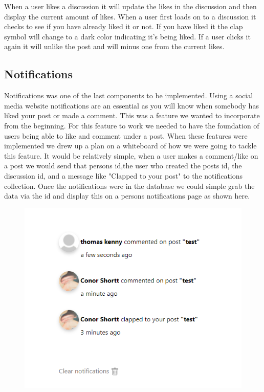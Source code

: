 When a user likes a discussion it will update the likes in the discussion and then display the current amount of likes. When a user first loads on to a discussion it checks to see if you have already liked it or not. If you have liked it the clap symbol will change to a dark color indicating it's being liked. If a user clicks it again it will unlike the post and will minus one from the current likes.

\subsection{Notifications}
Notifications was one of the last components to be implemented. Using a social media website notifications are an essential as you will know when somebody has liked your post or made a comment. This was a feature we wanted to incorporate from the beginning. 
For this feature to work we needed to have the foundation of users being able to like and comment under a post. When these features were implemented we drew up a plan on a whiteboard of how we were going to tackle this feature. It would be relatively simple, when a user makes a comment/like on a post we would send that persons id,the user who created the posts id, the discussion id, and a message like "Clapped to your post" to the notifications collection. Once the notifications were in the database we could simple grab the data via the id and display this on a persons notifications page as shown here.
\begin{figure}[H]
  \centering
  \includegraphics[scale=0.55]{img/notifications.PNG}
  \label{fig:Notifications}
\end{figure}

